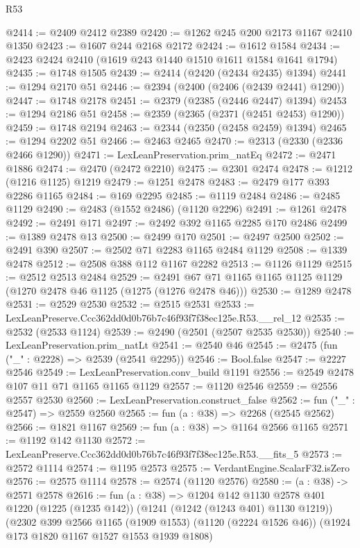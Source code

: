 \begin{lexlean}{R53}
\begin{coremodule}
@2414 := @2409 @2412 @2389
@2420 := @1262 @245 @200 @2173 @1167 @2410 @1350
@2423 := @1607 @244 @2168 @2172
@2424 := @1612 @1584
@2434 := @2423 @2424 @2410 (@1619 @243 @1440 @1510 @1611 @1584 @1641 @1794)
@2435 := @1748 @1505
@2439 := @2414 (@2420 (@2434 @2435) @1394)
@2441 := @1294 @2170 @51
@2446 := @2394 (@2400 (@2406 (@2439 @2441) @1290))
@2447 := @1748 @2178
@2451 := @2379 (@2385 (@2446 @2447) @1394)
@2453 := @1294 @2186 @51
@2458 := @2359 (@2365 (@2371 (@2451 @2453) @1290))
@2459 := @1748 @2194
@2463 := @2344 (@2350 (@2458 @2459) @1394)
@2465 := @1294 @2202 @51
@2466 := @2463 @2465
@2470 := @2313 (@2330 (@2336 @2466 @1290))
@2471 := LexLeanPreservation.prim_natEq
@2472 := @2471 @1886
@2474 := @2470 (@2472 @2210)
@2475 := @2301 @2474
@2478 := @1212 (@1216 @1125) @1219
@2479 := @1251 @2478
@2483 := @2479 @177 @393 @2286 @1165
@2484 := @169 @2295
@2485 := @1119 @2484
@2486 := @2485 @1129
@2490 := @2483 (@1552 @2486) (@1120 @2296)
@2491 := @1261 @2478
@2492 := @2491 @171
@2497 := @2492 @392 @1165 @2285 @170 @2486
@2499 := @1389 @2478 @13
@2500 := @2499 @170
@2501 := @2497 @2500
@2502 := @2491 @390
@2507 := @2502 @71 @2283 @1165 @2484 @1129
@2508 := @1339 @2478
@2512 := @2508 @388 @112 @1167 @2282
@2513 := @1126 @1129
@2515 := @2512 @2513 @2484
@2529 := @2491 @67 @71 @1165 @1165 @1125 @1129 (@1270 @2478 @46 @1125 (@1275 (@1276 @2478 @46)))
@2530 := @1289 @2478
@2531 := @2529 @2530
@2532 := @2515 @2531
@2533 := LexLeanPreserve.Ccc362dd0d0b76b7c46f93f7f38ec125e.R53.__rel_12
@2535 := @2532 (@2533 @1124)
@2539 := @2490 (@2501 (@2507 @2535 @2530))
@2540 := LexLeanPreservation.prim_natLt
@2541 := @2540 @46
@2545 := @2475 (fun ("_" : @2228) => @2539 (@2541 @2295))
@2546 := Bool.false
@2547 := @2227 @2546
@2549 := LexLeanPreservation.conv_build @1191
@2556 := @2549 @2478 @107 @11 @71 @1165 @1165 @1129
@2557 := @1120 @2546
@2559 := @2556 @2557 @2530
@2560 := LexLeanPreservation.construct_false
@2562 := fun ("_" : @2547) => @2559 @2560
@2565 := fun (a : @38) => @2268 (@2545 @2562)
@2566 := @1821 @1167
@2569 := fun (a : @38) => @1164 @2566 @1165
@2571 := @1192 @142 @1130
@2572 := LexLeanPreserve.Ccc362dd0d0b76b7c46f93f7f38ec125e.R53.__fits_5
@2573 := @2572 @1114
@2574 := @1195 @2573
@2575 := VerdantEngine.ScalarF32.isZero
@2576 := @2575 @1114
@2578 := @2574 (@1120 @2576)
@2580 := (a : @38) -> @2571 @2578
@2616 := fun (a : @38) =>
  @1204
    @142
    @1130
    @2578
    @401
    @1220
    (@1225 (@1235 @142))
    (@1241 (@1242 (@1243 @401) @1130 @1219))
    (@2302
      @399
      @2566
      @1165
      (@1909 @1553)
      (@1120 (@2224 @1526 @46))
      (@1924 @173 @1820 @1167 @1527 @1553 @1939 @1808)

\end{coremodule}
\end{lexlean}
